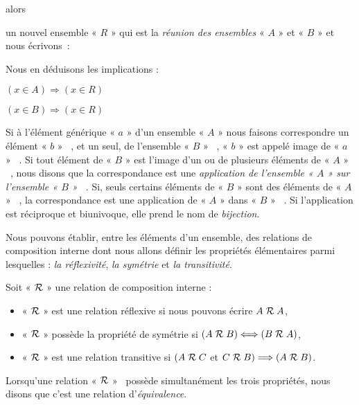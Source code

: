 alors {\samepage un nouvel ensemble « $R$ » qui est la \textit{réunion
des ensembles} « $A$ » et « $B$ » et nous écrivons~:

\nopagebreak\medskip

\begin{center}
\end{center}
\medskip
\nopagebreak

Nous en déduisons les implications :
\medskip
\begin{center}
$(x\in A)\Longrightarrow(x\in R)$
\end{center}
\medskip
\begin{center}
$(x\in B)\Longrightarrow(x\in R)$ 
\end{center}
\medskip
Si à l'élément générique « $a$ » d'un ensemble « $A$ » nous
faisons correspondre un élément « $b$ » ~, et un seul, de l'ensemble
« $B$ » ~, « $b$ » est appelé image de « $a$ » ~. Si tout
élément de « $B$ » est l'image d'un ou de plusieurs éléments
de « $A$ » ~, nous disons que la correspondance est une \textit{application
de l'ensemble « $A$ » sur l'ensemble « $B$ » ~}. Si, seuls
certains éléments de « $B$ » sont des éléments de « $A$ » ~,
la correspondance est une application de « $A$ » dans « $B$ » ~.
Si l'application est réciproque et biunivoque, elle prend le nom de
\textit{bijection}.

Nous pouvons établir, entre les éléments d'un ensemble, des relations
de composition interne dont nous allons définir les propriétés élémentaires
parmi lesquelles : \textit{la réflexivité}, \textit{la symétrie} et
\textit{la transitivité}.

Soit « ${\cal R}$ » une relation de composition interne :
\begin{itemize}
\item « ${\cal R}$ » est une relation réflexive si nous pouvons écrire
$A\;{\cal R}\;A$,
\item « ${\cal R}$ » possède la propriété de symétrie si $(A\;{\cal R}\;B)\Longleftrightarrow(B\;{\cal R}\;A)$,
\item « ${\cal R}$ » est une relation transitive si $(A\;{\cal R}\;C$
et $C\;{\cal R}\;B)\Longrightarrow(A\;{\cal R}\;B)$.
\end{itemize}
Lorsqu'une relation « ${\cal R}$ » ~possède simultanément les trois
propriétés, nous disons que c'est une relation d'\emph{équivalence}.

}
